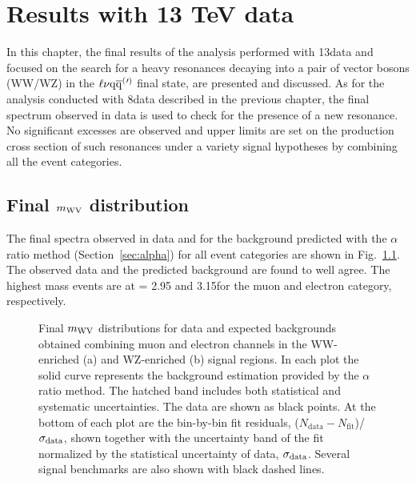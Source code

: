 \chapter{Results with 13 TeV data}
\label{ch:results13}

In this chapter, the final results of the analysis performed with 13\TeV data and focused on the search for a heavy resonances decaying into a pair of vector bosons (WW/WZ)
in the $\ell\nu\mathrm{q}\overline{\mathrm{q}}^({}'^){}$ final state, are presented and discussed.
As for the analysis conducted with 8\TeV data described in the previous chapter, the final \mWV spectrum observed in data is used to check for the presence of a new resonance.
No significant excesses are observed and upper limits are set on the production cross section of such resonances under a variety signal hypotheses by combining all the event categories.

\section{Final $m_{\rm WV}$ distribution}

The final \mWV spectra observed in data and for the background predicted with the $\alpha$ ratio method (Section~\ref{sec:alpha}) for all event categories are shown in Fig.~\ref{fig:mWV-final}.
The observed data and the predicted background are found to well agree. The highest mass events are at \mWV = 2.95 and 3.15\TeV for the muon and electron category, respectively.

\begin{figure}[!htb]
\centering
{}
\caption{%
Final $m_{\rm WV}$ distributions for data and expected backgrounds obtained combining muon and electron channels in the WW-enriched (a) and WZ-enriched (b) signal regions.
In each plot the solid curve represents the background estimation provided by the $\alpha$ ratio method.
The hatched band includes both statistical and systematic uncertainties.
The data are shown as black points. At the bottom of each plot are the bin-by-bin fit residuals, ($N_\mathrm{data} - N_\mathrm{fit}$)/$\sigma_{\rm data}$, shown together with the uncertainty band of the fit normalized by the statistical uncertainty of data, $\sigma_{\rm data}$. Several signal benchmarks are also shown with black dashed lines.}
\label{fig:mWV-final}
\end{figure}

